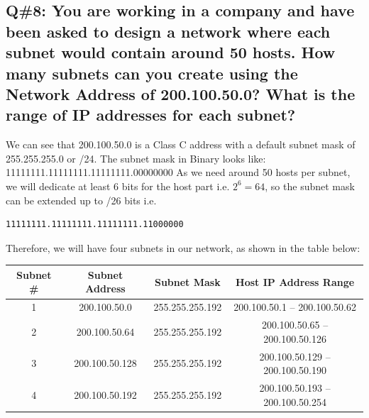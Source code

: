 \subsection*{Q\#8: You are working in a company and have been asked to design a network where each subnet would contain around 50 hosts. How many subnets can you create using the Network Address of 200.100.50.0? What is the range of IP addresses for each subnet?}
We can see that 200.100.50.0 is a Class C address with a default subnet mask of 255.255.255.0 or /24. The subnet mask in Binary looks like: 11111111.11111111.11111111.00000000
As we need around 50 hosts per subnet, we will dedicate at least 6 bits for the host part i.e. $2^6 = 64$, so the subnet mask can be extended up to /26 bits i.e.
\begin{verbatim}
11111111.11111111.11111111.11000000
\end{verbatim}
Therefore, we will have four subnets in our network, as shown in the table below:
\begin{center}
\begin{tabular}{|c|c|c|c|}
\hline
\textbf{Subnet \#} & \textbf{Subnet Address} & \textbf{Subnet Mask} & \textbf{Host IP Address Range} \\
\hline
1 & 200.100.50.0 & 255.255.255.192 & 200.100.50.1 -- 200.100.50.62 \\
\hline
2 & 200.100.50.64 & 255.255.255.192 & 200.100.50.65 -- 200.100.50.126 \\
\hline
3 & 200.100.50.128 & 255.255.255.192 & 200.100.50.129 -- 200.100.50.190 \\
\hline
4 & 200.100.50.192 & 255.255.255.192 & 200.100.50.193 -- 200.100.50.254 \\
\hline
\end{tabular}
\end{center}
